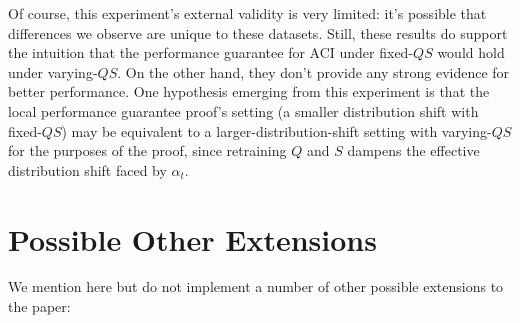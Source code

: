 \documentclass[
]{article}
\begin{document}
Of course, this experiment's external validity is very limited: it's
possible that differences we observe are unique to these datasets.
Still, these results do support the intuition that the performance
guarantee for ACI under fixed-\(QS\) would hold under varying-\(QS\). On
the other hand, they don't provide any strong evidence for better
performance. One hypothesis emerging from this experiment is that the
local performance guarantee proof's setting (a smaller distribution
shift with fixed-\(QS\)) may be equivalent to a
larger-distribution-shift setting with varying-\(QS\) for the purposes
of the proof, since retraining \(Q\) and \(S\) dampens the effective
distribution shift faced by \(\alpha_t\).

\hypertarget{possible-other-extensions}{%
\section{Possible Other Extensions}\label{possible-other-extensions}}

We mention here but do not implement a number of other possible
extensions to the paper:
\end{document}
